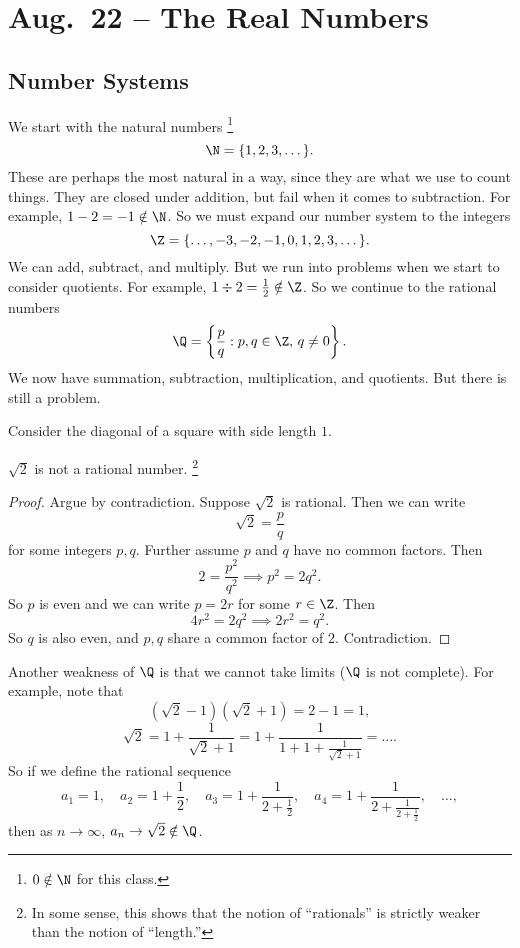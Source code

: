 \chapter{Aug.~22 -- The Real Numbers}

\section{Number Systems}
We start with the natural numbers
\footnote{$0 \notin \N$ for this class.}
\[\N = \{1, 2, 3, \dots\}.\]
These are perhaps
the most natural in a way, since they are what we use to
count things. They are closed under addition, but
fail when it comes to subtraction. For example,
$1 - 2 = -1 \notin \N$.
So we must expand our number system to the
integers
\[\Z = \{\dots, -3, -2, -1, 0, 1, 2, 3, \dots\}.\]
We can add, subtract, and
multiply. But we run into problems when we start to
consider quotients. For example,
$1 \div 2 = \frac{1}{2} \notin \Z$.
So we continue to the rational numbers
\[\Q = \left\{\frac{p}{q} : p, q \in \Z,\, q \ne 0\right\}.\]
We now have summation, subtraction,
multiplication, and quotients. But there is still a
problem.

Consider the diagonal of a square with side length $1$.

\begin{theorem}
  $\sqrt{2}$ is not a rational number. 
  \footnote{
    In some sense, this shows that the notion of
    ``rationals'' is strictly weaker than the notion of
    ``length.''
  }
\end{theorem}

\begin{proof}
  Argue by contradiction. Suppose $\sqrt{2}$ is rational.
  Then we can write
   \[
     \sqrt{2} = \frac{p}{q}
  \]
  for some integers $p, q$. Further assume $p$ and
  $q$ have no common factors. Then
  \[2 = \frac{p^2}{q^2} \implies p^2 = 2q^2.\]
  So $p$ is even and we can write $p = 2r$ for some
  $r \in \Z$. Then
  \[4r^2 = 2q^2 \implies 2r^2 = q^2.\]
  So $q$ is also even, and $p, q$ share a common factor
  of $2$. Contradiction.
\end{proof}

Another weakness of $\Q$ is that we cannot take limits
($\Q$ is not complete). For example, note that
\[(\sqrt{2} - 1)(\sqrt{2} + 1) = 2 - 1 = 1,\]
\[
  \sqrt{2} = 1 + \frac{1}{\sqrt{2} + 1}
  = 1 + \frac{1}{1 + 1 + \frac{1}{\sqrt{2} + 1}}
  = \dots
.\]
So if we define the rational sequence
\[
  a_1 = 1, \quad
  a_2 = 1 + \frac{1}{2}, \quad
  a_3 = 1 + \frac{1}{2 + \frac{1}{2}}, \quad
  a_4 = 1 + \frac{1}{2 + \frac{1}{2 + \frac{1}{2}}},
  \quad \dots
,\]
then as $n \to \infty$, $a_n \to \sqrt{2} \notin \Q$.

